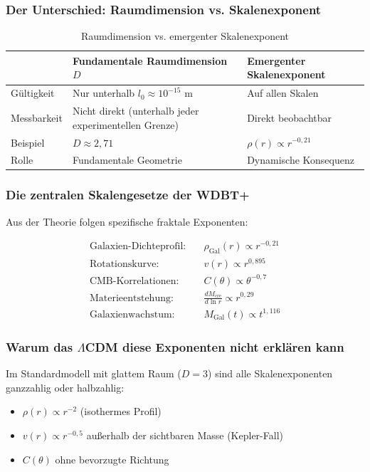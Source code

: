 \documentclass[12pt,a4paper]{article}
\begin{document}
\subsubsection{Der Unterschied: Raumdimension vs. Skalenexponent}

\begin{table}[ht]
\centering
\caption{Raumdimension vs. emergenter Skalenexponent}
\begin{tabular}{p{3cm}p{5cm}p{4cm}}
\toprule
& Fundamentale Raumdimension $D$ & Emergenter Skalenexponent \\
\midrule
Gültigkeit & Nur unterhalb $l_0 \approx 10^{-15}$ m & Auf allen Skalen \\
Messbarkeit & Nicht direkt (unterhalb jeder experimentellen Grenze) & Direkt beobachtbar \\
Beispiel & $D \approx 2,71$ & $\rho(r) \propto r^{-0,21}$ \\
Rolle & Fundamentale Geometrie & Dynamische Konsequenz \\
\bottomrule
\end{tabular}
\end{table}

\subsubsection{Die zentralen Skalengesetze der WDBT+}

Aus der Theorie folgen spezifische fraktale Exponenten:

\begin{align}
\text{Galaxien-Dichteprofil:} \quad & \rho_{\text{Gal}}(r) \propto r^{-0,21} \\
\text{Rotationskurve:} \quad & v(r) \propto r^{0,895} \\
\text{CMB-Korrelationen:} \quad & C(\theta) \propto \theta^{-0,7} \\
\text{Materieentstehung:} \quad & \frac{dM_{\text{cre}}}{d\ln r} \propto r^{0,29} \\
\text{Galaxienwachstum:} \quad & M_{\text{Gal}}(t) \propto t^{1,116}
\end{align}

\subsubsection{Warum das $\Lambda$CDM diese Exponenten nicht erklären kann}

Im Standardmodell mit glattem Raum ($D=3$) sind alle Skalenexponenten ganzzahlig oder halbzahlig:
\begin{itemize}
\item $\rho(r) \propto r^{-2}$ (isothermes Profil)
\item $v(r) \propto r^{-0,5}$ außerhalb der sichtbaren Masse (Kepler-Fall)
\item $C(\theta)$ ohne bevorzugte Richtung
\end{itemize}
\end{document}
